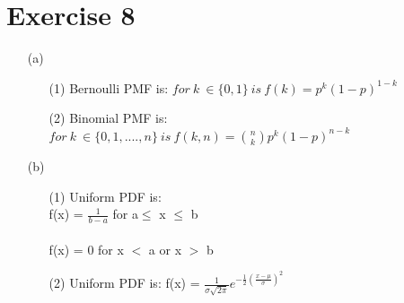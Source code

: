 \documentclass[a4paper]{article}
\begin{document}
\section*{Exercise 8}
\begin{itemize}
\item[(a)]
\begin{itemize}
\item[(1)]Bernoulli PMF is: $ for\ k\ \in \{0,1\}\ is\ f(k) = p^{k}(1-p)^{1-k}$
\item[(2)]Binomial PMF is: $ for\ k\ \in \{0,1, ...., n\}\ is\ f(k,n) = {n\choose k} p^{k}(1-p)^{n-k}$
\end{itemize}
\item[(b)]
\begin{itemize}
\item[(1)]Uniform PDF is:\\

f(x) = $\frac{1}{b-a}$ for a$\leq$ x $\leq$ b\\\\
f(x) = 0 for x $<$ a or x $>$ b

\item[(2)]Uniform PDF is: f(x) = $\frac{1}{\sigma\sqrt{2\pi}}e^{-\frac{1}{2}(\frac{x-\mu}{\sigma})^{2}}$


\end{itemize}
\end{itemize}
\end{document}
